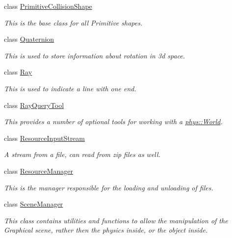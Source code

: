\begin{DoxyCompactItemize}
class \hyperlink{classphys_1_1PrimitiveCollisionShape}{PrimitiveCollisionShape}
\begin{DoxyCompactList}\small\item\em This is the base class for all Primitive shapes. \item\end{DoxyCompactList}\item 
class \hyperlink{classphys_1_1Quaternion}{Quaternion}
\begin{DoxyCompactList}\small\item\em This is used to store information about rotation in 3d space. \item\end{DoxyCompactList}\item 
class \hyperlink{classphys_1_1Ray}{Ray}
\begin{DoxyCompactList}\small\item\em This is used to indicate a line with one end. \item\end{DoxyCompactList}\item 
class \hyperlink{classphys_1_1RayQueryTool}{RayQueryTool}
\begin{DoxyCompactList}\small\item\em This provides a number of optional tools for working with a \hyperlink{classphys_1_1World}{phys::World}. \item\end{DoxyCompactList}\item 
class \hyperlink{classphys_1_1ResourceInputStream}{ResourceInputStream}
\begin{DoxyCompactList}\small\item\em A stream from a file, can read from zip files as well. \item\end{DoxyCompactList}\item 
class \hyperlink{classphys_1_1ResourceManager}{ResourceManager}
\begin{DoxyCompactList}\small\item\em This is the manager responsible for the loading and unloading of files. \item\end{DoxyCompactList}\item 
class \hyperlink{classphys_1_1SceneManager}{SceneManager}
\begin{DoxyCompactList}\small\item\em This class contains utilities and functions to allow the manipulation of the Graphical scene, rather then the physics inside, or the object inside. \item\end{DoxyCompactList}\item 

\end{DoxyCompactItemize}
